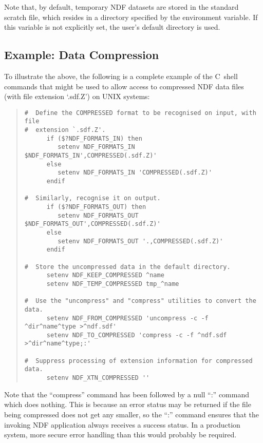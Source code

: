 Note that, by default, temporary NDF datasets are stored in the
standard  scratch file, which resides in a
directory specified by the 
environment variable. If this variable is not explicitly set, the
user's default directory is used.

\subsection{\label{sect:datacompression}Example: Data Compression}

To illustrate the above, the following is a complete example of the
C~shell commands that might be used to allow access to compressed NDF
data files (with file extension `.sdf.Z') on UNIX systems:

\begin{quote}
\begin{small}
\begin{verbatim}
#  Define the COMPRESSED format to be recognised on input, with file
#  extension `.sdf.Z'.
      if ($?NDF_FORMATS_IN) then
         setenv NDF_FORMATS_IN $NDF_FORMATS_IN',COMPRESSED(.sdf.Z)'
      else
         setenv NDF_FORMATS_IN 'COMPRESSED(.sdf.Z)'
      endif

#  Similarly, recognise it on output.
      if ($?NDF_FORMATS_OUT) then
         setenv NDF_FORMATS_OUT $NDF_FORMATS_OUT',COMPRESSED(.sdf.Z)'
      else
         setenv NDF_FORMATS_OUT '.,COMPRESSED(.sdf.Z)'
      endif

#  Store the uncompressed data in the default directory.
      setenv NDF_KEEP_COMPRESSED ^name
      setenv NDF_TEMP_COMPRESSED tmp_^name

#  Use the "uncompress" and "compress" utilities to convert the data.
      setenv NDF_FROM_COMPRESSED 'uncompress -c -f ^dir^name^type >^ndf.sdf'
      setenv NDF_TO_COMPRESSED 'compress -c -f ^ndf.sdf >^dir^name^type;:'

#  Suppress processing of extension information for compressed data.
      setenv NDF_XTN_COMPRESSED ''
\end{verbatim}
\end{small}
\end{quote}

Note that the ``compress'' command has been followed by a null ``:''
command which does nothing. This is because an error status may be
returned if the file being compressed does not get any smaller, so the
``:'' command ensures that the invoking NDF application always
receives a success status. In a production system, more secure error
handling than this would probably be required.

